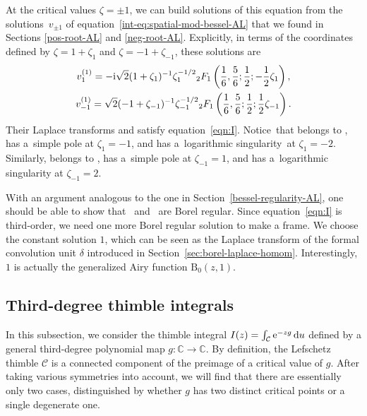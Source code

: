 \documentclass[10pt,a4paper]{amsart}
\newcommand{\singexp}[2]{\mathcal{H}L^\infty_{#1, #2}}
\newcommand{\singexpalg}[1]{\singexp{#1}{\bullet}}
\newcommand{\maps}{\colon}
\newcommand{\C}{\mathbb{C}}
\newcommand{\laplace}{\mathcal{L}}
\numberwithin{equation}{section}
\begin{document}
At the critical values $\zeta = \pm 1$, we can build solutions  of this equation from the solutions~$v_{\pm 1}$ of equation~\eqref{int-eq:spatial-mod-bessel-AL} that we found in Sections \ref{pos-root-AL} and \ref{neg-root-AL}. Explicitly, in terms of the coordinates defined by $\zeta = 1 + \zeta_1$ and $\zeta = -1 + \zeta_{-1}$, these solutions are
\begin{gather*}
v^{(1)}_1 = -{\rm i}\sqrt{2} (1 + \zeta_1)^{-1} \zeta_1^{-1/2} {}_2F_1\left(\frac{1}{6},\frac{5}{6};\frac{1}{2};-\frac{1}{2}\zeta_{1}\right), \\
v^{(1)}_{-1} = \sqrt{2} (-1 + \zeta_{-1})^{-1} \zeta_{-1}^{-1/2} {}_2F_1\left(\frac{1}{6},\frac{5}{6};\frac{1}{2};\frac{1}{2}\zeta_{-1}\right).
\end{gather*}
Their Laplace transforms \smash{$V^{(1)}_1 = \laplace_{\zeta, 1} v^{(1)}_1$} and \smash{$V^{(1)}_{-1} = \laplace_{\zeta, -1} v^{(1)}_{-1}$} satisfy equation~\eqref{eqn:I}. Notice~that  belongs to \smash{$\singexpalg{-1/2}(\Omega_1)$}, has a~simple pole at $\zeta_1 = -1$, and has a~logarithmic singularity~at $\zeta_1 = -2$. Similarly,  belongs to \smash{$\singexpalg{1/2}(\Omega_{-1})$}, has a~simple pole at $\zeta_{-1} = 1$, and has a~logarithmic singularity at $\zeta_{-1} = 2$.

With an argument analogous to the one in Section~\ref{bessel-regularity-AL}, one should be able to show that~ and~ are Borel regular. Since equation~\eqref{eqn:I} is third-order, we need one more Borel regular solution to make a frame. We choose the constant solution $1$, which can be seen as the Laplace transform of the formal convolution unit $\delta$ introduced in Section~\ref{sec:borel-laplace-homom}. Interestingly, $1$ is actually the generalized Airy function $\mathrm{B}_0(z,1)$.
%
\subsection{Third-degree thimble integrals}\label{sec:deg3}
In this subsection, we consider the thimble integral
$I(z) = \int_{\mathcal{C}} {\rm e}^{-zg}\, {\rm d}u$
defined by a general third-degree polynomial map $g \maps \C \to \C$. By definition, the Lefschetz thimble $\mathcal{C}$ is a connected component of the preimage of a critical value of $g$. After taking various symmetries into account, we will find that there are essentially only two cases, distinguished by whether $g$ has two distinct critical points or a single degenerate one.
\end{document}
